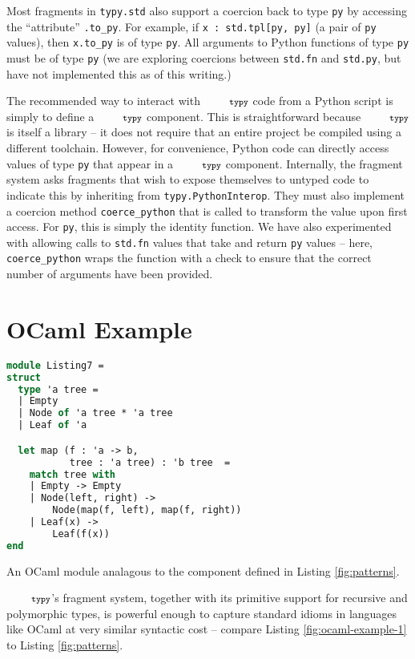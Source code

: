 \documentclass[10pt]{sigplanconf}
\newcommand{\typy}{\texttt{\footnotesize typy}}
\newcommand{\lip}[1]{\lstinline[language=Python,basicstyle=\ttfamily\footnotesize,morekeywords={with},deletendkeywords={tuple,buffer,map}]{#1}}
\newcommand{\li}[1]{\lip{#1}}
\begin{document}
Most fragments in \li{typy.std} also support a coercion back to type \li{py} by accessing the ``attribute'' \li{.to_py}. For example, if \li{x : std.tpl[py, py]} (a pair of \li{py} values), then \li{x.to_py} is of type \li{py}. All arguments to Python functions of type \li{py} must be of type \li{py} (we are exploring coercions between \li{std.fn} and \li{std.py}, but have not implemented this as of this writing.)

The recommended way to interact with $\typy$ code from a Python script is simply to define a $\typy$ component. This is straightforward because $\typy$ is itself a library -- it does not require that an entire project be compiled using a different toolchain. However, for convenience, Python code can directly access values of type \li{py} that appear in a $\typy$ component. Internally, the fragment system asks fragments that wish to expose themselves to untyped code to indicate this by inheriting from \li{typy.PythonInterop}. They must also implement a coercion method \li{coerce_python} that is called to transform the value upon first access. For \li{py}, this is simply the identity function. We have also experimented with allowing calls to \li{std.fn} values that take and return \li{py} values -- here, \li{coerce_python} wraps the function with a check to ensure that the correct number of arguments have been provided. 


\section{OCaml Example}\label{sec:ocaml-examples}
\begin{codelisting}[h!]
\vspace{-3px}
\begin{lstlisting}[language=ML, morekeywords={module,match}]
module Listing7 = 
struct
  type 'a tree = 
  | Empty
  | Node of 'a tree * 'a tree
  | Leaf of 'a

  let map (f : 'a -> b, 
           tree : 'a tree) : 'b tree  =
    match tree with 
    | Empty -> Empty
    | Node(left, right) -> 
        Node(map(f, left), map(f, right))
    | Leaf(x) -> 
        Leaf(f(x))
end
\end{lstlisting}
\caption{An OCaml module analagous to the component defined in Listing \ref{fig:patterns}.}
\label{fig:ocaml-example-1}
\end{codelisting}

\noindent $\typy$'s fragment system, together with its primitive support for recursive and polymorphic types, is powerful enough to capture standard idioms in languages like OCaml at very similar syntactic cost -- compare Listing \ref{fig:ocaml-example-1} to Listing \ref{fig:patterns}. 
\end{document}
